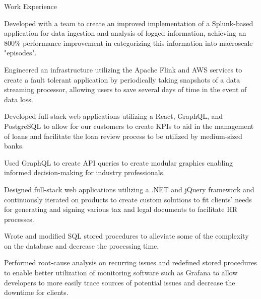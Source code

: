 \documentclass{resume} %
\begin{document}
\begin{workSection}{Work Experience}
    \experienceItem[
        company=Splunk,
        location=San Jose{,} CA,
        position=Backend Software Engineer Intern,
        duration=May 2023 - July 2023
    ]
     \begin{bullets}
        \item Developed with a team to create an improved implementation of a Splunk-based application for data ingestion and analysis of logged information, achieving an 800\% performance improvement in categorizing this information into macroscale "episodes".
        \item Engineered an infrastructure utilizing the Apache Flink and AWS services to create a fault tolerant application by periodically taking snapshots of a data streaming processor, allowing users to save several days of time in the event of data loss.
     \end{bullets}
     
    \experienceItem[
        company=QwickRate,
        location=Marietta{,} GA (Remote),
        position=Software Engineer Intern,
        duration=August 2022 - April 2023
    ]
    \begin{bullets}
        \item Developed full-stack web applications utilizing a React, GraphQL, and PostgreSQL to allow for our customers to create KPIs to aid in the management of loans and facilitate the loan review process to be utilized by medium-sized banks.
        \item Used GraphQL to create API queries to create modular graphics enabling informed decision-making for industry professionals.
     \end{bullets}

     \experienceItem[
        company=Ultimate Kronos Group (UKG),
        location=Atlanta{,} GA,
        position=Full-stack Software Engineer Intern,
        duration=January 2022 - August 2022,
     ]
     \begin{bullets}
        \item Designed full-stack web applications utilizing a .NET and jQuery framework and continuously iterated on products to create custom solutions to fit clients' needs for generating and signing various tax and legal documents to facilitate HR processes.
        \item Wrote and modified SQL stored procedures to alleviate some of the complexity on the database and decrease the processing time.
        \item Performed root-cause analysis on recurring issues and redefined stored procedures to enable better utilization of monitoring software such as Grafana to allow developers to more easily trace sources of potential issues and decrease the downtime for clients.
     \end{bullets}
     
\end{workSection}
\end{document}
